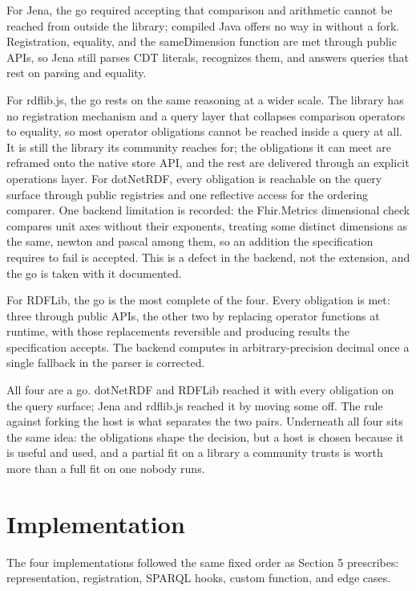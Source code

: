 For Jena, the go required accepting that comparison and arithmetic cannot be reached from outside the library; compiled Java offers no way in without a fork. Registration, equality, and the sameDimension function are met through public APIs, so Jena still parses CDT literals, recognizes them, and answers queries that rest on parsing and equality.

For rdflib.js, the go rests on the same reasoning at a wider scale. The library has no registration mechanism and a query layer that collapses comparison operators to equality, so most operator obligations cannot be reached inside a query at all. It is still the library its community reaches for; the obligations it can meet are reframed onto the native store API, and the rest are delivered through an explicit operations layer.
For dotNetRDF, every obligation is reachable on the query surface through public registries and one reflective access for the ordering comparer. One backend limitation is recorded: the Fhir.Metrics dimensional check compares unit axes without their exponents, treating some distinct dimensions as the same, newton and pascal among them, so an addition the specification requires to fail is accepted. This is a defect in the backend, not the extension, and the go is taken with it documented.

For RDFLib, the go is the most complete of the four. Every obligation is met: three through public APIs, the other two by replacing operator functions at runtime, with those replacements reversible and producing results the specification accepts. The backend computes in arbitrary-precision decimal once a single fallback in the parser is corrected.

All four are a go. dotNetRDF and RDFLib reached it with every obligation on the query surface; Jena and rdflib.js reached it by moving some off. The rule against forking the host is what separates the two pairs. Underneath all four sits the same idea: the obligations shape the decision, but a host is chosen because it is useful and used, and a partial fit on a library a community trusts is worth more than a full fit on one nobody runs.


\section{Implementation}

The four implementations followed the same fixed order as Section 5 prescribes: representation, registration, SPARQL hooks, custom function, and edge cases.

